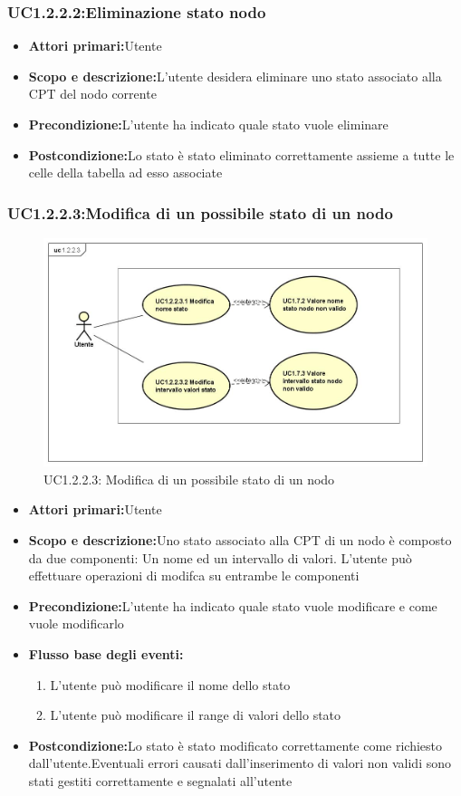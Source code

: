 \subsubsection{UC1.2.2.2:Eliminazione stato nodo}
\begin{itemize}
	\item{\textbf{Attori primari:}Utente}
	\item{\textbf{Scopo e descrizione:}L'utente desidera eliminare uno stato associato alla CPT del nodo corrente}
	\item{\textbf{Precondizione:}L'utente ha indicato quale stato vuole eliminare}
	\item{\textbf{Postcondizione:}Lo stato è stato eliminato correttamente assieme a tutte le celle della tabella ad esso associate}
\end{itemize}
\subsubsection{UC1.2.2.3:Modifica di un possibile stato di un nodo}
\begin{figure} [H]
	\centering
	\includegraphics[scale=0.45]{Img/UC1-2-2-3}
	\caption{UC1.2.2.3: Modifica di un possibile stato di un nodo}\label{}
\end{figure}
\begin{itemize}
	\item{\textbf{Attori primari:}Utente}
	\item{\textbf{Scopo e descrizione:}Uno stato associato alla CPT di un nodo è composto da due componenti: Un nome ed un intervallo di valori. L'utente può effettuare operazioni di modifca su entrambe le componenti}
	\item{\textbf{Precondizione:}L'utente ha indicato quale stato vuole modificare e come vuole modificarlo}
	\item{\textbf{Flusso base degli eventi:}
		\begin{enumerate}
			\item{L'utente può modificare il nome dello stato}
			\item{L'utente può modificare il range di valori dello stato}
		\end{enumerate}			
	}
	\item{\textbf{Postcondizione:}Lo stato è stato modificato correttamente come richiesto dall'utente.Eventuali errori causati dall'inserimento di valori non validi sono stati gestiti correttamente e segnalati all'utente}
\end{itemize}
